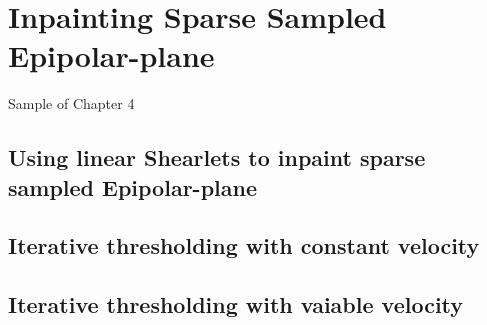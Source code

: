 \chapter{Inpainting Sparse Sampled Epipolar-plane}

Sample of Chapter 4

\section{Using linear Shearlets to inpaint sparse sampled Epipolar-plane}

\section{Iterative thresholding with constant velocity}

\section{Iterative thresholding with vaiable velocity}


